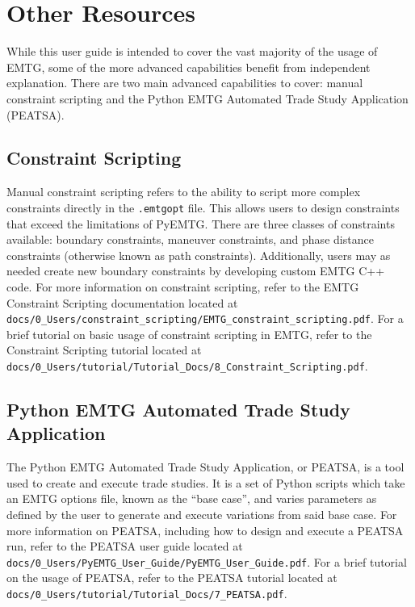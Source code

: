 \chapter{Other Resources}
\label{chap:other_resources}

While this user guide is intended to cover the vast majority of the usage of \ac{EMTG}, some of the more advanced capabilities benefit from independent explanation. There are two main advanced capabilities to cover: manual constraint scripting and the Python \ac{EMTG} Automated Trade Study Application (PEATSA).

\section{Constraint Scripting}
Manual constraint scripting refers to the ability to script more complex constraints directly in the {\tt .emtgopt} file. This allows users to design constraints that exceed the limitations of PyEMTG. There are three classes of constraints available: boundary constraints, maneuver constraints, and phase distance constraints (otherwise known as path constraints). Additionally, users may as needed create new boundary constraints by developing custom \ac{EMTG} C++ code. For more information on constraint scripting, refer to the \ac{EMTG} Constraint Scripting documentation located at {\tt docs/0\_Users/constraint\_scripting/\ac{EMTG}\_constraint\_scripting.pdf}. For a brief tutorial on basic usage of constraint scripting in \ac{EMTG}, refer to the Constraint Scripting tutorial located at {\tt docs/0\_Users/tutorial/Tutorial\_Docs/8\_Constraint\_Scripting.pdf}.


\section{Python EMTG Automated Trade Study Application}
The Python \ac{EMTG} Automated Trade Study Application, or PEATSA, is a tool used to create and execute trade studies. It is a set of Python scripts which take an \ac{EMTG} options file, known as the ``base case'', and varies parameters as defined by the user to generate and execute variations from said base case. 
For more information on PEATSA, including how to design and execute a PEATSA run, refer to the PEATSA user guide located at {\tt docs/0\_Users/PyEMTG\_User\_Guide/PyEMTG\_User\_Guide.pdf}. For a brief tutorial on the usage of PEATSA, refer to the PEATSA tutorial located at {\tt docs/0\_Users/tutorial/Tutorial\_Docs/7\_PEATSA.pdf}.
